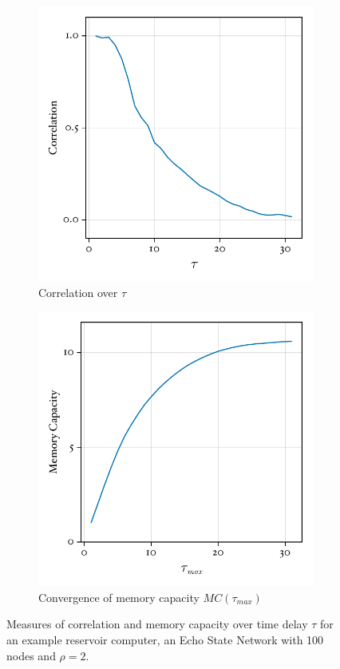 \documentclass[a4paper,12pt]{article}
\begin{document}
\begin{figure}
\centering
\begin{subfigure}{.5\textwidth}
  \centering
  \includegraphics[width=\linewidth]{correlation}
  \caption{Correlation over $\tau$}
  \label{fig:correlation}
\end{subfigure}%
\begin{subfigure}{.507\textwidth}
  \centering
  \includegraphics[width=\linewidth]{memory_capacity}
  \caption{Convergence of memory capacity $MC(\tau_{max})$}
  \label{fig:memory_capacity}
\end{subfigure}
\caption{Measures of correlation and memory capacity over time delay $\tau$ for an example reservoir computer, an Echo State Network with 100 nodes and $\rho=2$.}
\end{figure}
\end{document}
